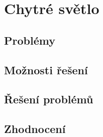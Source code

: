 \section{Chytré světlo}\label{sec:chytre-svetlo}
\subsection{Problémy}\label{subsec:chytre-svetlo-problemy}
\subsection{Možnosti řešení}\label{subsec:chytre-svetlo-moznosti-reseni}
\subsection{Řešení problémů}\label{subsec:chytre-svetlo-reseni-problemu}
\subsection{Zhodnocení}\label{subsec:chytre-svetlo-zhodnoceni}